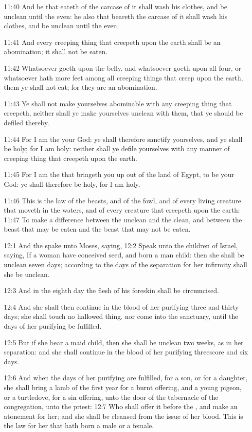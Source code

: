 11:40 And he that eateth of the carcase of it shall wash his clothes,
and be unclean until the even: he also that beareth the carcase of it
shall wash his clothes, and be unclean until the even.

11:41 And every creeping thing that creepeth upon the earth shall be
an abomination; it shall not be eaten.

11:42 Whatsoever goeth upon the belly, and whatsoever goeth upon all
four, or whatsoever hath more feet among all creeping things that
creep upon the earth, them ye shall not eat; for they are an
abomination.

11:43 Ye shall not make yourselves abominable with any creeping thing
that creepeth, neither shall ye make yourselves unclean with them,
that ye should be defiled thereby.

11:44 For I am the \LORD your God: ye shall therefore sanctify
yourselves, and ye shall be holy; for I am holy: neither shall ye
defile yourselves with any manner of creeping thing that creepeth upon
the earth.

11:45 For I am the \LORD that bringeth you up out of the land of Egypt,
to be your God: ye shall therefore be holy, for I am holy.

11:46 This is the law of the beasts, and of the fowl, and of every
living creature that moveth in the waters, and of every creature that
creepeth upon the earth: 11:47 To make a difference between the
unclean and the clean, and between the beast that may be eaten and the
beast that may not be eaten.

12:1 And the \LORD spake unto Moses, saying, 12:2 Speak unto the
children of Israel, saying, If a woman have conceived seed, and born a
man child: then she shall be unclean seven days; according to the days
of the separation for her infirmity shall she be unclean.

12:3 And in the eighth day the flesh of his foreskin shall be
circumcised.

12:4 And she shall then continue in the blood of her purifying three
and thirty days; she shall touch no hallowed thing, nor come into the
sanctuary, until the days of her purifying be fulfilled.

12:5 But if she bear a maid child, then she shall be unclean two
weeks, as in her separation: and she shall continue in the blood of
her purifying threescore and six days.

12:6 And when the days of her purifying are fulfilled, for a son, or
for a daughter, she shall bring a lamb of the first year for a burnt
offering, and a young pigeon, or a turtledove, for a sin offering,
unto the door of the tabernacle of the congregation, unto the priest:
12:7 Who shall offer it before the \LORD, and make an atonement for
her; and she shall be cleansed from the issue of her blood. This is
the law for her that hath born a male or a female.

